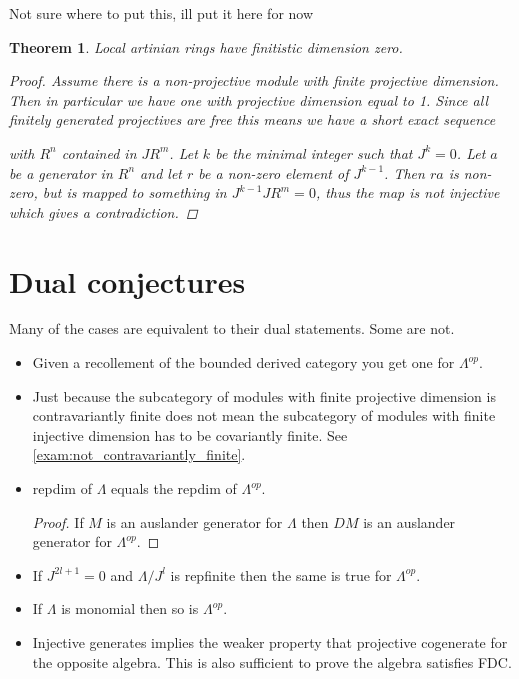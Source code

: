\documentclass[11pt, a4paper, english]{article}
\newtheorem{theorem}{Theorem}[section]
\theoremstyle{definition}
\begin{document}
Not sure where to put this, ill put it here for now
\begin{theorem}
	Local artinian rings have finitistic dimension zero.
	\begin{proof}
		Assume there is a non-projective module with finite projective dimension. Then in particular we have one with projective dimension equal to 1. Since all finitely generated projectives are free this means we have a short exact sequence
		\begin{center}
		\end{center}
	with $R^n$ contained in $JR^m$. Let $k$ be the minimal integer such that $J^k=0$. Let $a$ be a generator in $R^n$ and let $r$ be a non-zero element of $J^{k-1}$. Then $ra$ is non-zero, but is mapped to something in $J^{k-1}JR^m=0$, thus the map is not injective which gives a contradiction. 
	\end{proof}
\end{theorem}

\section{Dual conjectures}

Many of the cases are equivalent to their dual statements. Some are not.
\begin{itemize}
	\item Given a recollement of the bounded derived category you get one for $\Lambda^{op}$. 
	\item Just because the subcategory of modules with finite projective dimension is contravariantly finite does not mean the subcategory of modules with finite injective dimension has to be covariantly finite. See \cref{exam:not_contravariantly_finite}.
	\item repdim of $\Lambda$ equals the repdim of $\Lambda^{op}$.
	\begin{proof}
		If $M$ is an auslander generator for $\Lambda$ then $DM$ is an auslander generator for $\Lambda^{op}$.
	\end{proof}
	\item If $J^{2l+1} = 0$ and $\Lambda/J^l$ is repfinite then the same is true for $\Lambda^{op}$.
	\item If $\Lambda$ is monomial then so is $\Lambda^{op}$.
	\item Injective generates implies the weaker property that projective cogenerate for the opposite algebra. This is also sufficient to prove the algebra satisfies FDC.\cite[Section~5]{Rick19} 
\end{itemize}
\end{document}
